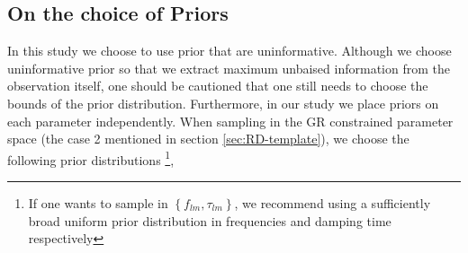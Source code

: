 \subsection{On the choice of Priors}
\label{sec:prior-gen}
In this study we choose to use prior that are uninformative. Although we choose uninformative prior so that we extract maximum unbaised information from the observation itself, one should be cautioned that one still needs to choose the bounds of the prior distribution. Furthermore, in our study we place priors on each parameter independently. When sampling in the GR constrained parameter space (the case 2 mentioned in section \ref{sec:RD-template}), we choose the following prior distributions \footnote{If one wants to sample in $\left\lbrace f_{lm}, \tau_{lm} \right\rbrace$, we recommend using a sufficiently broad uniform prior distribution in frequencies and damping time respectively}, 



